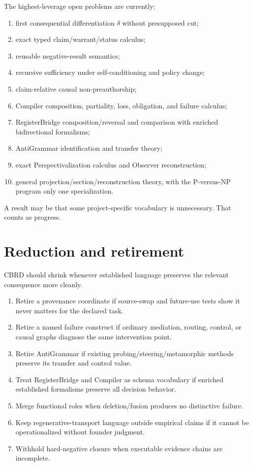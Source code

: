 The highest-leverage open problems are currently:
\begin{enumerate}
\item first consequential differentiation $\delta$ without presupposed cut;
\item exact typed claim/warrant/status calculus;
\item reusable negative-result semantics;
\item recursive sufficiency under self-conditioning and policy change;
\item claim-relative causal non-preauthorship;
\item Compiler composition, partiality, loss, obligation, and failure calculus;
\item RegisterBridge composition/reversal and comparison with enriched bidirectional formalisms;
\item AntiGrammar identification and transfer theory;
\item exact Perspectivalization calculus and Observer reconstruction;
\item general projection/section/reconstruction theory, with the P-versus-NP program only one specialization.
\end{enumerate}

A result may be that some project-specific vocabulary is unnecessary. That counts as progress.

\section{Reduction and retirement}

CBRD should shrink whenever established language preserves the relevant consequence more cleanly.
\begin{enumerate}
\item Retire a provenance coordinate if source-swap and future-use tests show it never matters for the declared task.
\item Retire a named failure construct if ordinary mediation, routing, control, or causal graphs diagnose the same intervention point.
\item Retire AntiGrammar if existing probing/steering/metamorphic methods preserve its transfer and control value.
\item Treat RegisterBridge and Compiler as schema vocabulary if enriched established formalisms preserve all decision behavior.
\item Merge functional roles when deletion/fusion produces no distinctive failure.
\item Keep regenerative-transport language outside empirical claims if it cannot be operationalized without founder judgment.
\item Withhold hard-negative closure when executable evidence chains are incomplete.
\end{enumerate}

